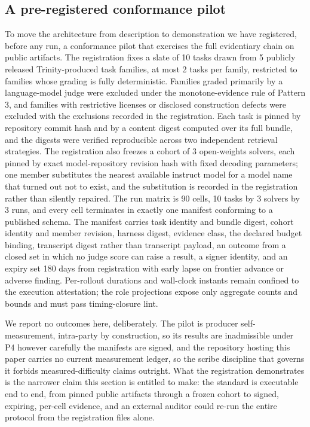 \documentclass[11pt]{article}
\begin{document}
\subsection{A pre-registered conformance pilot}
\label{sec:pilot}

To move the architecture from description to demonstration we have registered, before any run, a conformance pilot that exercises the full evidentiary chain on public artifacts. The registration fixes a slate of 10 tasks drawn from 5 publicly released Trinity-produced task families, at most 2 tasks per family, restricted to families whose grading is fully deterministic. Families graded primarily by a language-model judge were excluded under the monotone-evidence rule of Pattern 3, and families with restrictive licenses or disclosed construction defects were excluded with the exclusions recorded in the registration. Each task is pinned by repository commit hash and by a content digest computed over its full bundle, and the digests were verified reproducible across two independent retrieval strategies. The registration also freezes a cohort of 3 open-weights solvers, each pinned by exact model-repository revision hash with fixed decoding parameters; one member substitutes the nearest available instruct model for a model name that turned out not to exist, and the substitution is recorded in the registration rather than silently repaired. The run matrix is 90 cells, 10 tasks by 3 solvers by 3 runs, and every cell terminates in exactly one manifest conforming to a published schema. The manifest carries task identity and bundle digest, cohort identity and member revision, harness digest, evidence class, the declared budget binding, transcript digest rather than transcript payload, an outcome from a closed set in which no judge score can raise a result, a signer identity, and an expiry set 180 days from registration with early lapse on frontier advance or adverse finding. Per-rollout durations and wall-clock instants remain confined to the execution attestation; the role projections expose only aggregate counts and bounds and must pass timing-closure lint.

We report no outcomes here, deliberately. The pilot is producer self-measurement, intra-party by construction, so its results are inadmissible under P4 however carefully the manifests are signed, and the repository hosting this paper carries no current measurement ledger, so the scribe discipline that governs it forbids measured-difficulty claims outright. What the registration demonstrates is the narrower claim this section is entitled to make: the standard is executable end to end, from pinned public artifacts through a frozen cohort to signed, expiring, per-cell evidence, and an external auditor could re-run the entire protocol from the registration files alone.
\end{document}
